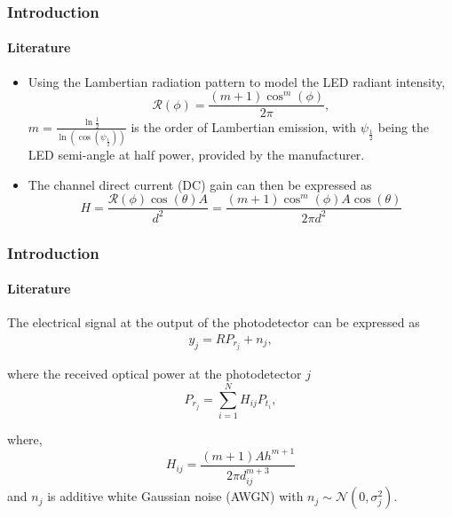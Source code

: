 \documentclass{beamer}
\providecommand{\brak}[1]{\ensuremath{\left(#1\right)}}
\theoremstyle{remark}
\begin{document}
\begin{frame}
\frametitle{Introduction}
\framesubtitle{Literature}
\begin{itemize}
\vfill
\item<1->Using the Lambertian radiation pattern to model the LED radiant intensity, %
\begin{equation}
\mathcal{R}\brak{\phi}=\frac{\brak{m+1}\cos^m\brak{\phi}}{2\pi}, \nonumber
\end{equation}
$m=\frac{\ln{\frac{1}{2}}}{\ln\brak{\cos\brak{\psi_{\frac{1}{2}}}}}$ is the order of Lambertian emission, with $\psi_{\frac{1}{2}}$ being the LED semi-angle at half power, provided by the manufacturer.\\
\vfill
\item<2>The channel direct current (DC) gain can then be  expressed as %
\begin{equation}
\label{propagation_old}
H=\frac{\mathcal{R}(\phi)\cos(\theta)A}{d^2}=\frac{\brak{m+1}\cos^m\brak{\phi}A\cos(\theta)}{2\pi d^2} \nonumber
\end{equation}
\vfill
\end{itemize}
\end{frame}


\begin{frame}
\frametitle{Introduction}
\framesubtitle{Literature}
\begin{list}{} {} 
\item<1-> The electrical signal at the output
of the photodetector can be expressed as 
%
\begin{align}
\label{rx_j}
y_j=RP_{r_j}+n_j,\nonumber
\end{align}
%
\item<2->
 where the received optical power at the photodetector $j$
\begin{equation}
P_{r_j} = \sum_{i=1}^NH_{ij}  P_{t_i},\nonumber
\end{equation}
\item<3>
where,
\begin{equation}
\label{propagation}
H_{ij}=\frac{\brak{m+1}Ah^{m+1}}{2\pi d_{ij}^{m+3}}\nonumber
\end{equation}
and $n_j$  is  additive white Gaussian noise (AWGN) with $n_{j}\sim \mathcal{N}\brak{0,\sigma_j^2}$.
\end{list}
\end{frame}
\end{document}
